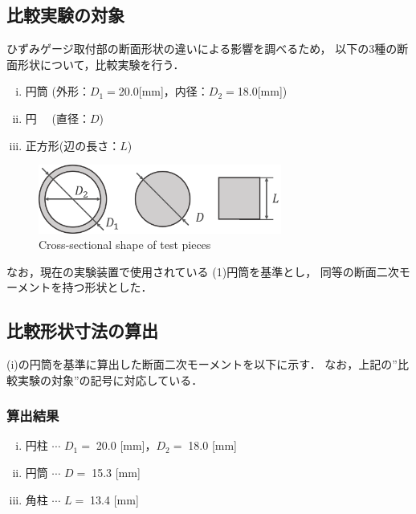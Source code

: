\documentclass[twocolumn,a4j]{jsarticle}
\begin{document}
\newpage
\subsection{比較実験の対象}
ひずみゲージ取付部の断面形状の違いによる影響を調べるため，
以下の3種の断面形状について，比較実験を行う．\par
\begin{enumerate}[(i)]
    \item 円筒  (外形：$D_1=$20.0[mm]，内径：$D_2=$18.0[mm])
    \item 円　  (直径：$D$)
    \item 正方形(辺の長さ：$L$)
\end{enumerate}
\begin{figure}[htbp]
    \footnotesize
    \begin{center}
        \includegraphics[width=80mm]{../images/testpieces_2.png}
        \caption{Cross-sectional shape of test pieces}
    \end{center}
\end{figure}
なお，現在の実験装置で使用されている (1)円筒を基準とし，
同等の断面二次モーメントを持つ形状とした．\\

\subsection{比較形状寸法の算出}
(i)の円筒を基準に算出した断面二次モーメントを以下に示す．
なお，上記の”比較実験の対象”の記号に対応している．

\subsubsection{算出結果}
\begin{screen}
    \begin{enumerate}[(i)]
        \item 円柱 $\cdots$ $D_1=\;$20.0 [mm]，$D_2=\;$18.0 [mm]
        \item 円筒 $\cdots$ $D=\;$15.3 [mm]
        \item 角柱 $\cdots$ $L=\;$13.4 [mm]
    \end{enumerate}
\end{screen}
\end{document}
